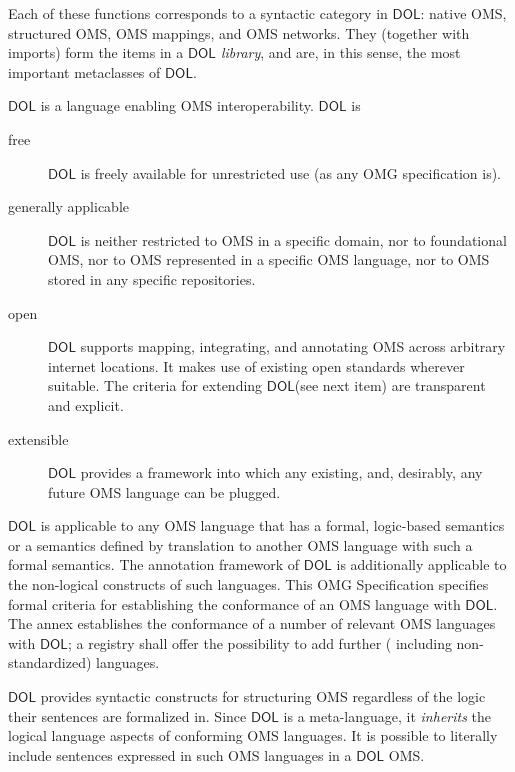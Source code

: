 \documentclass[10pt, a4paper]{isov2}
\newcommand*{\IS}{OMG Specification\xspace}
\newcommand*{\DOL}{\ensuremath{\mathsf{DOL}}\xspace}
\begin{document}
 Each of these functions corresponds to a syntactic category in \DOL: native OMS, structured
 OMS, OMS mappings, and OMS networks. They (together with imports) form the items in a
\emph{\DOL library}, and are, in this sense, the most important metaclasses of \DOL. 


\sclause{Features of \DOL}\label{c:req:overview}

\DOL is a language enabling OMS interoperability. 
\DOL is
 \begin{description} 
\item[free] \DOL is freely available for unrestricted use (as any OMG specification is).
\item[generally applicable] \DOL is neither restricted to OMS in a specific domain, nor to foundational OMS, nor to OMS represented in a specific OMS language, nor to OMS stored in any specific repositories.
\item[open] \DOL supports mapping, integrating, and annotating OMS across arbitrary internet locations.  It makes use of existing open standards wherever suitable.  The criteria for extending \DOL (see next item) are transparent and explicit.
\item[extensible] \DOL provides a framework into which any existing, and, desirably, any future OMS language can be plugged.
 \end{description} 
\DOL is applicable to any OMS language that has a formal, logic-based semantics or a semantics defined by translation to another OMS language with such a formal semantics. The annotation framework of \DOL is additionally applicable to the non-logical constructs of such languages. This \IS specifies formal criteria for establishing the conformance of an OMS language with \DOL.  The annex establishes the conformance of a number of relevant OMS languages with \DOL; a registry shall offer the possibility to add further ( including non-standardized) languages. 

\DOL provides syntactic constructs for structuring OMS regardless of the logic their sentences are formalized in. 
Since \DOL is a meta-language,  it \textit{inherits} the logical language aspects of conforming OMS languages.  It is possible to literally include sentences expressed in such OMS languages in a \DOL OMS.
\end{document}
